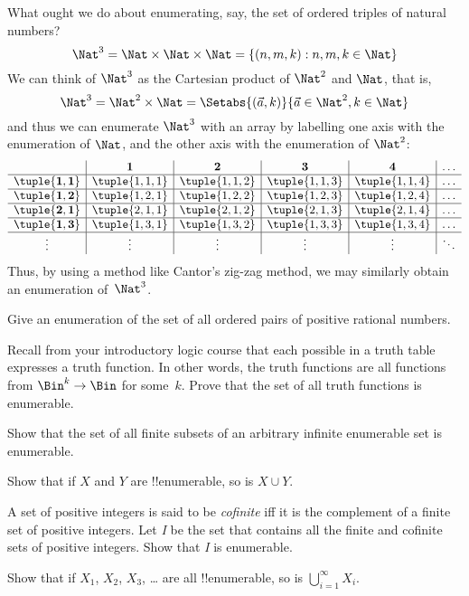 \documentclass[../../include/open-logic-section]{subfiles}
\begin{document}
\begin{explain}
What ought we do about enumerating, say, the set of ordered triples 
of natural numbers?
\[ 
\Nat^3 = \Nat \times \Nat \times \Nat = \{ (n,m,k) : n,m,k \in \Nat \} 
\]
We can think of $\Nat^3$ as the Cartesian product of
$\Nat^2$ and $\Nat$, that is, 
\[ 
\Nat^3 = \Nat^2 \times \Nat = \Setabs{(\vec a, 
k)}{\vec a \in \Nat^2, k \in \Nat } 
\]
and thus we can enumerate $\Nat^3$ with an array by 
labelling one axis with the enumeration of $\Nat$, and the 
other axis with the enumeration of $\Nat^2$:
\[
\begin{array}{ c | c | c | c | c | c}
& \textbf 1 & \textbf 2 & \textbf 3 & \textbf 4 & \dots \\
\hline
\mathbf{\tuple{1,1}} & \tuple{1,1,1} & \tuple{1,1,2} & \tuple{1,1,3} & \tuple{1,1,4} & \dots \\
\hline
\mathbf{\tuple{1,2}} & \tuple{1,2,1} & \tuple{1,2,2} & \tuple{1,2,3} & \tuple{1,2,4} & \dots \\
\hline
\mathbf{\tuple{2,1}} & \tuple{2,1,1} & \tuple{2,1,2} & \tuple{2,1,3} & \tuple{2,1,4} & \dots \\
\hline
\mathbf{\tuple{1,3}} & \tuple{1,3,1} & \tuple{1,3,2} & \tuple{1,3,3} & \tuple{1,3,4} & \dots\\
\hline
\vdots & \vdots & \vdots & \vdots & \vdots & \ddots \\
\end{array}
\]
Thus, by using a method like Cantor's zig-zag method, we may 
similarly obtain an enumeration of~$\Nat^3$. 
\end{explain}

\begin{prob}
Give an enumeration of the set of all ordered pairs of positive
rational numbers.
\end{prob}

\begin{prob}
Recall from your introductory logic course that each possible in a
truth table expresses a truth function. In other words, the truth
functions are all functions from $\Bin^k \to \Bin$ for some~$k$. Prove
that the set of all truth functions is enumerable.
\end{prob}

\begin{prob}
Show that the set of all finite subsets of an arbitrary infinite
enumerable set is enumerable.
\end{prob}

\begin{prob}
Show that if $X$ and $Y$ are !!{enumerable}, so is $X \cup Y$.
\end{prob}

\begin{prob}
A set of positive integers is said to be \emph{cofinite} iff
it is the complement of a finite set of positive integers. Let
\emph{I} be the set that contains all the finite and cofinite sets of
positive integers. Show that \emph{I} is enumerable.
\end{prob}

\begin{prob}
Show that if $X_1$, $X_2$, $X_3$, \dots{} are all !!{enumerable}, so
is $\bigcup_{i=1}^\infty X_i$.
\end{prob}
\end{document}
